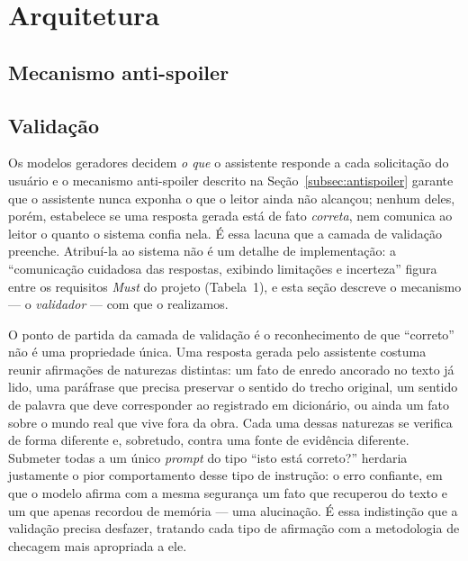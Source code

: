 \section{Arquitetura}

\subsection{Mecanismo anti-spoiler}

\subsection{Validação}

Os modelos geradores decidem \textit{o que} o assistente responde a cada solicitação do usuário e o mecanismo anti-spoiler descrito na Seção~\ref{subsec:antispoiler} garante que o assistente nunca exponha o que o leitor ainda não alcançou; nenhum deles, porém, estabelece se uma resposta gerada está de fato \textit{correta}, nem comunica ao leitor o quanto o sistema confia nela. É essa lacuna que a camada de validação preenche. Atribuí-la ao sistema não é um detalhe de implementação: a ``comunicação cuidadosa das respostas, exibindo limitações e incerteza'' figura entre os requisitos \textit{Must} do projeto (Tabela~1), e esta seção descreve o mecanismo --- o \textit{validador} --- com que o realizamos.

O ponto de partida da camada de validação é o reconhecimento de que ``correto'' não é uma propriedade única. Uma resposta gerada pelo assistente costuma reunir afirmações de naturezas distintas: um fato de enredo ancorado no texto já lido, uma paráfrase que precisa preservar o sentido do trecho original, um sentido de palavra que deve corresponder ao registrado em dicionário, ou ainda um fato sobre o mundo real que vive fora da obra. Cada uma dessas naturezas se verifica de forma diferente e, sobretudo, contra uma fonte de evidência diferente. Submeter todas a um único \textit{prompt} do tipo ``isto está correto?'' herdaria justamente o pior comportamento desse tipo de instrução: o erro confiante, em que o modelo afirma com a mesma segurança um fato que recuperou do texto e um que apenas recordou de memória --- uma alucinação. É essa indistinção que a validação precisa desfazer, tratando cada tipo de afirmação com a metodologia de checagem mais apropriada a ele.

